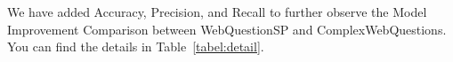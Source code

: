 We have added Accuracy, Precision, and Recall to further observe the Model Improvement Comparison between WebQuestionSP and ComplexWebQuestions. You can find the details in Table~\ref{tabel:detail}.